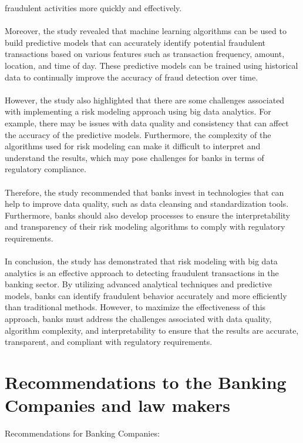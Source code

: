 fraudulent activities more quickly and effectively.\\\\
Moreover, the study revealed that machine learning algorithms can be used to build predictive models that can 
accurately identify potential fraudulent transactions based on various features such as transaction frequency, 
amount, location, and time of day. These predictive models can be trained using historical data to continually 
improve the accuracy of fraud detection over time.\\\\
However, the study also highlighted that there are some challenges associated with implementing a risk modeling 
approach using big data analytics. For example, there may be issues with data quality and consistency that can 
affect the accuracy of the predictive models. Furthermore, the complexity of the algorithms used for risk modeling 
can make it difficult to interpret and understand the results, which may pose challenges for banks in terms of 
regulatory compliance.\\\\
Therefore, the study recommended that banks invest in technologies that can help to improve data quality, such as 
data cleansing and standardization tools. Furthermore, banks should also develop processes to ensure the 
interpretability and transparency of their risk modeling algorithms to comply with regulatory requirements.\\\\
In conclusion, the study has demonstrated that risk modeling with big data analytics is an effective approach to 
detecting fraudulent transactions in the banking sector. By utilizing advanced analytical techniques and predictive 
models, banks can identify fraudulent behavior accurately and more efficiently than traditional methods. However, 
to maximize the effectiveness of this approach, banks must address the challenges associated with data quality, 
algorithm complexity, and interpretability to ensure that the results are accurate, transparent, and compliant 
with regulatory requirements.

\section{Recommendations to the Banking Companies and law makers}

Recommendations for Banking Companies:

